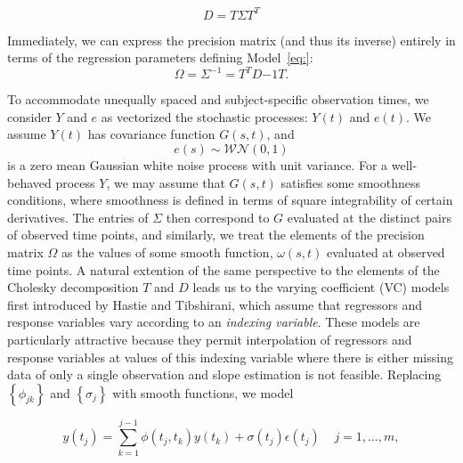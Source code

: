 \documentclass[12pt]{article}
\theoremstyle{definition}
\begin{document}
\begin{equation}
\nonumber
D = T \Sigma T^T
\end{equation} 

Immediately, we can express the precision matrix (and thus its inverse) entirely in terms of the regression parameters defining Model~\ref{eq:}:
\begin{equation} \label{eq:omega_decomp}
\Omega= \Sigma^{-1} = T^T D{-1} T.
\end{equation}

To accommodate unequally spaced and subject-specific observation times, we consider $Y$ and $e$ as vectorized the stochastic processes: $Y\left(t\right)$ and $e\left(t\right)$.  We assume $Y\left(t\right)$ has covariance function $G\left(s,t\right)$, and
\[
e\left(s\right) \sim \mathcal{WN}\left(0,1\right)
\] 
is a zero mean Gaussian white noise process with unit variance. For a well-behaved process $Y$, we may assume that $G\left(s,t\right)$ satisfies some smoothness conditions, where smoothness is defined in terms of square integrability of certain derivatives. The entries of $\Sigma$ then correspond to $G$ evaluated at the distinct pairs of observed time points, and similarly, we treat the elements of the precision matrix $\Omega$ as the values of some smooth function, $\omega\left(s,t\right)$ evaluated at observed time points. A natural extention of the same perspective to the elements of the Cholesky decomposition $T$ and $D$ leads us to  %
the varying coefficient (VC) models first introduced by Hastie and Tibshirani, which assume that  regressors and response variables vary according to an \emph{indexing variable}. These models are particularly attractive because they permit interpolation of regressors and response variables at values of this indexing variable where there is either missing data of only a single observation and slope estimation is not feasible. Replacing  $\left \{ \phi_{jk} \right\}$ and $\left\{ \sigma_j \right\}$ with smooth functions, we model 

\begin{equation}   
y\left(t_j \right)  = \sum_{k=1}^{j-1} \phi\left(t_j ,t_k\right) y\left(t_k\right) + \sigma\left(t_j\right)\epsilon\left({t_j}\right) \;\;\;\; j=1,\dots, m, 
\label{eq:MyModel} 
\end{equation}
\end{document}
